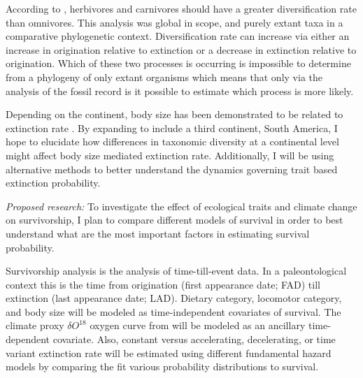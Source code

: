 \documentclass[12pt,letterpaper]{article}
\begin{document}
According to \citet{Price2012}, herbivores and carnivores should have a greater diversification rate than omnivores. This analysis was global in scope, and purely extant taxa in a comparative phylogenetic context. Diversification rate can increase via either an increase in origination relative to extinction or a decrease in extinction relative to origination. Which of these two processes is occurring is impossible to determine from a phylogeny of only extant organisms \citep{Rabosky2010a} which means that only via the analysis of the fossil record is it possible to estimate which process is more likely. 

Depending on the continent, body size has been demonstrated to be related to extinction rate \citep{Tomiya2013,Liow2008,Liow2009}. By expanding to include a third continent, South America, I hope to elucidate how differences in taxonomic diversity at a continental level might affect body size mediated extinction rate. Additionally, I will be using alternative methods to better understand the dynamics governing trait based extinction probability.

\textit{Proposed research:}
To investigate the effect of ecological traits and climate change on survivorship, I plan to compare different models of survival in order to best understand what are the most important factors in estimating survival probability.

Survivorship analysis is the analysis of time-till-event data. In a paleontological context this is the time from origination (first appearance date; FAD) till extinction (last appearance date; LAD). Dietary category, locomotor category, and body size will be modeled as time-independent covariates of survival. The climate proxy \(\delta O^{18}\) oxygen curve from \citet{Zachos2008} will be modeled as an ancillary time-dependent covariate. Also, constant versus accelerating, decelerating, or time variant extinction rate will be estimated using different fundamental hazard models by comparing the fit various probability distributions to survival.

\end{document}
